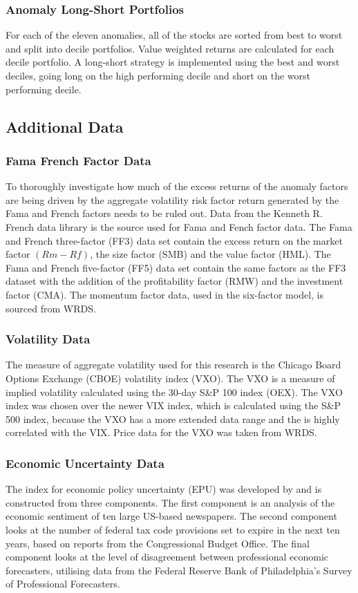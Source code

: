\documentclass[a4paper]{article}                 %
\begin{document}
\subsubsection{Anomaly Long-Short Portfolios}
For each of the eleven anomalies, all of the stocks are sorted from best to worst and split into decile portfolios. Value weighted returns are calculated for each decile portfolio. A long-short strategy is implemented using the best and worst deciles, going long on the high performing decile and short on the worst performing decile. 

\subsection{Additional Data}
\subsubsection{Fama French Factor Data}
To thoroughly investigate how much of the excess returns of the anomaly factors are being driven by the aggregate volatility risk factor return generated by the Fama and French factors needs to be ruled out. Data from the Kenneth R. French data library is the source used for Fama and Fench factor data. The Fama and French three-factor (FF3) data set contain the excess return on the market factor $(Rm - Rf)$, the size factor (SMB) and the value factor (HML). The Fama and French five-factor (FF5) data set contain the same factors as the FF3 dataset with the addition of the profitability factor (RMW) and the investment factor (CMA). The momentum factor data, used in the six-factor model, is sourced from WRDS.

\subsubsection{Volatility Data}
The measure of aggregate volatility used for this research is the Chicago Board Options Exchange (CBOE) volatility index (VXO). The VXO is a measure of implied volatility calculated using the 30-day S\&P 100 index (OEX). The VXO index was chosen over the newer VIX index, which is calculated using the S\&P 500 index, because the VXO has a more extended data range and the is highly correlated with the VIX. Price data for the VXO was taken from WRDS.

\subsubsection{Economic Uncertainty Data}
The index for economic policy uncertainty (EPU) was developed by\cite{baker2016measuring} and is constructed from three components. The first component is an analysis of the economic sentiment of ten large US-based newspapers. The second component looks at the number of federal tax code provisions set to expire in the next ten years, based on reports from the Congressional Budget Office. The final component looks at the level of disagreement between professional economic forecasters, utilising data from the Federal Reserve Bank of Philadelphia's Survey of Professional Forecasters.
\end{document}
